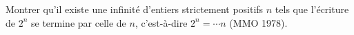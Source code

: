 Montrer qu'il existe une infinité d'entiers strictement positifs $n$ tels que l'écriture de $2^n$ se termine par celle de $n$, c'est-à-dire $2^n = \cdots n$ (MMO 1978).
